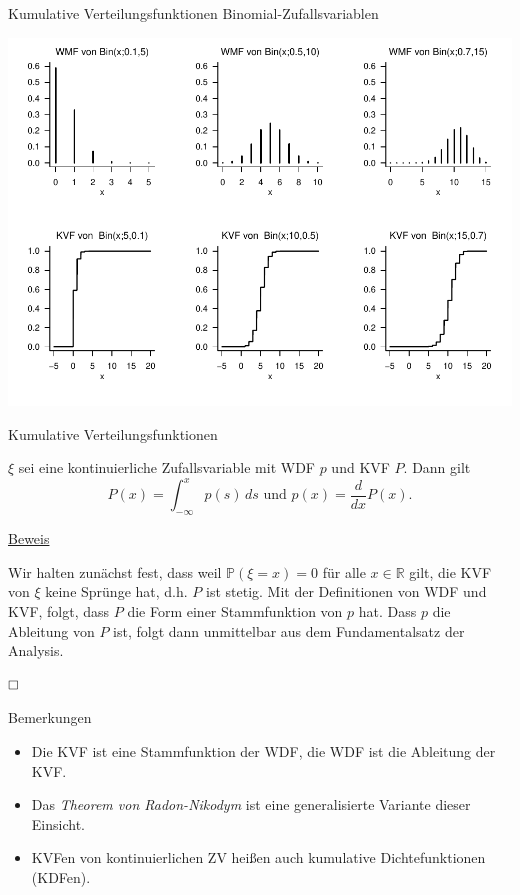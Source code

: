 \documentclass[
  8pt,
  ignorenonframetext,
]{beamer}
\begin{document}
\begin{frame}{Kumulative Verteilungsfunktionen}
\protect\hypertarget{kumulative-verteilungsfunktionen-7}{}
Binomial-Zufallsvariablen \vspace{.2cm}

\begin{center}\includegraphics[width=0.8\linewidth]{4_Abbildungen/wtfi_4_binomialverteilung_kvf} \end{center}
\end{frame}

\begin{frame}{Kumulative Verteilungsfunktionen}
\protect\hypertarget{kumulative-verteilungsfunktionen-8}{}
\small
\begin{theorem}
\justifying
\normalfont
$\xi$ sei eine kontinuierliche Zufallsvariable mit WDF $p$ und KVF $P$. Dann gilt
\begin{equation}
P(x) = \int_{-\infty}^x p(s)\,ds
\mbox{ und }
p(x) = \frac{d}{dx}P(x).
\end{equation}
\end{theorem}

\footnotesize

\underline{Beweis} \vspace{1mm}

Wir halten zunächst fest, dass weil \(\mathbb{P}(\xi = x) = 0\) für alle
\(x \in \mathbb{R}\) gilt, die KVF von \(\xi\) keine Sprünge hat, d.h.
\(P\) ist stetig. Mit der Definitionen von WDF und KVF, folgt, dass
\(P\) die Form einer Stammfunktion von \(p\) hat. Dass \(p\) die
Ableitung von \(P\) ist, folgt dann unmittelbar aus dem Fundamentalsatz
der Analysis.

\(\hfill \Box\)

Bemerkungen

\begin{itemize}
\item Die KVF ist eine Stammfunktion der WDF, die WDF ist die Ableitung der KVF.
\item Das \textit{Theorem von Radon-Nikodym} ist eine generalisierte Variante dieser Einsicht.
\item KVFen von kontinuierlichen ZV heißen auch kumulative Dichtefunktionen (KDFen).
\end{itemize}
\end{frame}
\end{document}
